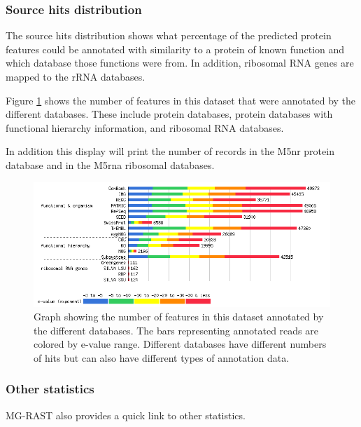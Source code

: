 \documentclass[12pt,fullpage]{report}
\begin{document}
\subsubsection{Source hits distribution}
\label{section:source-hits-distribution}
The source hits distribution shows what percentage of the predicted protein features could be annotated with similarity to a protein of known function and which database those functions were from. In addition, ribosomal RNA genes are mapped to the rRNA databases.

Figure \ref{fig:source-hits-distribution} shows the number of features in this dataset that were annotated by the different databases. These include protein databases, protein databases with functional hierarchy information, and ribosomal RNA databases.

In addition this display will print the number of records in the M5nr protein database and in the M5rna ribosomal databases. 

\begin{figure}
\begin{center}
\includegraphics[width=6in]{Images/source-hits-distribution.png}
\end{center}
\caption{Graph showing the number of features in this dataset annotated by the different databases.
 The bars representing annotated reads are colored by e-value range. Different databases have different numbers of hits but can also have different types of annotation data.}
\label{fig:source-hits-distribution}
\end{figure}
\subsubsection{Other statistics }

MG-RAST also provides a quick link to other statistics.
\end{document}
